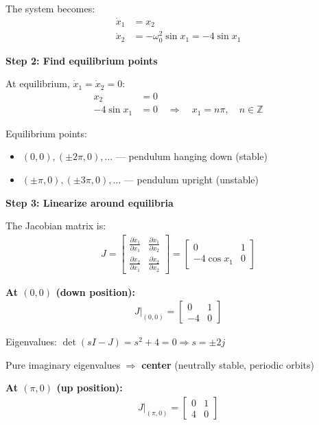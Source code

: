 \documentclass[11pt,a4paper]{article}
\begin{document}
The system becomes:
\begin{align}
\dot{x}_1 &= x_2 \\
\dot{x}_2 &= -\omega_0^2 \sin x_1 = -4\sin x_1
\end{align}

\textbf{Step 2: Find equilibrium points}

At equilibrium, $\dot{x}_1 = \dot{x}_2 = 0$:
\begin{align}
x_2 &= 0 \\
-4\sin x_1 &= 0 \quad \Rightarrow \quad x_1 = n\pi, \quad n \in \mathbb{Z}
\end{align}

Equilibrium points:
\begin{itemize}
\item $(0, 0), (\pm 2\pi, 0), \ldots$ — pendulum hanging down (stable)
\item $(\pm \pi, 0), (\pm 3\pi, 0), \ldots$ — pendulum upright (unstable)
\end{itemize}

\textbf{Step 3: Linearize around equilibria}

The Jacobian matrix is:
\begin{align}
J = \begin{bmatrix} \frac{\partial \dot{x}_1}{\partial x_1} & \frac{\partial \dot{x}_1}{\partial x_2} \\ \frac{\partial \dot{x}_2}{\partial x_1} & \frac{\partial \dot{x}_2}{\partial x_2} \end{bmatrix} = \begin{bmatrix} 0 & 1 \\ -4\cos x_1 & 0 \end{bmatrix}
\end{align}

\textbf{At $(0, 0)$ (down position):}
\begin{align}
J|_{(0,0)} = \begin{bmatrix} 0 & 1 \\ -4 & 0 \end{bmatrix}
\end{align}

Eigenvalues: $\det(sI - J) = s^2 + 4 = 0 \Rightarrow s = \pm 2j$

Pure imaginary eigenvalues $\Rightarrow$ \textbf{center} (neutrally stable, periodic orbits)

\textbf{At $(\pi, 0)$ (up position):}
\begin{align}
J|_{(\pi,0)} = \begin{bmatrix} 0 & 1 \\ 4 & 0 \end{bmatrix}
\end{align}
\end{document}
